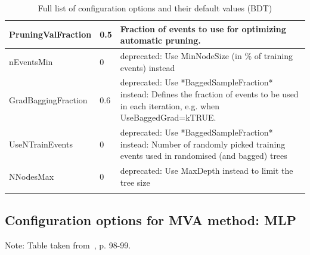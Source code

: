 \documentclass[11pt]{scrartcl}
\begin{document}
\begin{longtable}[c]{|p{4cm}|p{2.5cm}|p{7cm}|}
PruningValFraction   & 0.5                    & Fraction of events to use for optimizing automatic pruning.                                                                                                                                                                                                                                             \\ \hline
nEventsMin           & 0                      & deprecated: Use MinNodeSize (in \% of training events) instead                                                                                                                                                                                                                                          \\ \hline
GradBaggingFraction  & 0.6                    & deprecated: Use *BaggedSampleFraction* instead: Defines the fraction of events to be used in each iteration, e.g. when UseBaggedGrad=kTRUE.                                                                                                                                                             \\ \hline
UseNTrainEvents      & 0                      & deprecated: Use *BaggedSampleFraction* instead: Number of randomly picked training events used in randomised (and bagged) trees                                                                                                                                                                         \\ \hline
NNodesMax            & 0                      & deprecated: Use MaxDepth instead to limit the tree size                                                                                                                                                                                                                                                 \\ \hline

	\caption{Full list of configuration options and their default values (BDT)}
\end{longtable}

	\subsection{Configuration options for MVA method: MLP}
	Note: Table taken from~\cite{TMVA}, p. 98-99.
	
	\label{sec:annex-MLPdef}
	
\end{document}
